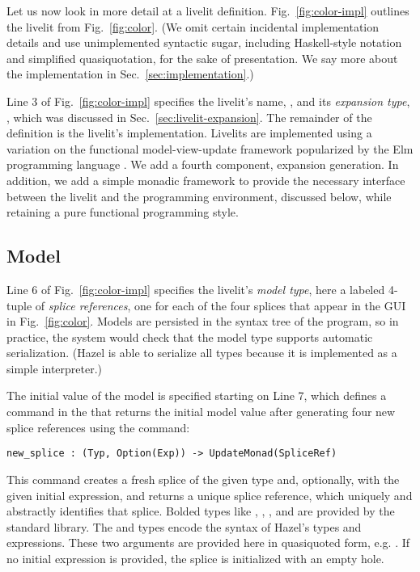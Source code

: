 \noindent
Let us now look in more detail at a livelit definition. Fig.~\ref{fig:color-impl}
outlines the  livelit from Fig.~\ref{fig:color}. (We omit certain 
incidental implementation details and use unimplemented syntactic sugar, including
Haskell-style  notation and simplified quasiquotation, for the sake of presentation.
We say more about the implementation in Sec.~\ref{sec:implementation}.)

Line 3 of Fig.~\ref{fig:color-impl} specifies the livelit's name, , and its \emph{expansion type},
, which was discussed in Sec.~\ref{sec:livelit-expansion}.
The remainder of the definition is the livelit's implementation.
Livelits are implemented using a variation on the functional model-view-update
framework popularized by the Elm programming language \cite{ElmArchitecture}. We add a fourth component,
expansion generation. In addition, we add a simple monadic framework to provide the necessary  
interface between the livelit and the programming environment, discussed below, while retaining
a pure functional programming style.

\subsection{Model}\label{sec:model}
Line 6 of Fig.~\ref{fig:color-impl} specifies the livelit's \emph{model type},
here a labeled 4-tuple of \emph{splice references}, one for each of the four splices
that appear in the GUI in Fig.~\ref{fig:color}.
Models are persisted in the syntax tree of the program, so in practice,
 the system would check that the model type supports automatic serialization. 
 (Hazel is able to serialize all types because it is implemented as a 
 simple interpreter.)

The initial value of the model is specified starting on Line 7, 
which defines a command in the  that returns the 
initial model value after generating four new splice references
using the  command:
\begin{lstlisting}[numbers=none]
new_splice : (Typ, Option(Exp)) -> UpdateMonad(SpliceRef)
\end{lstlisting}
This command creates a fresh splice
of the given type and, optionally, with the given initial expression,
and returns a unique splice reference, which uniquely and abstractly identifies that splice.
Bolded types like , , , and 
are provided by the standard library. The  and  types 
encode the syntax of Hazel's types and expressions.
These two arguments are provided here in quasiquoted form, e.g.  \cite{bawden1999quasiquotation}. 
If no initial expression is provided, the splice is initialized with 
an empty hole.

